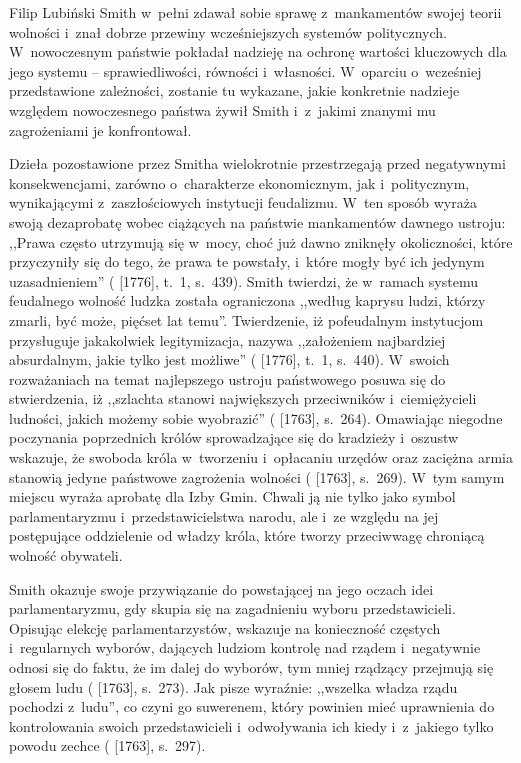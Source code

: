 \begin{artplenv}{Filip Lubiński}
Smith w~pełni zdawał sobie sprawę z~mankamentów swojej teorii wolności i~znał dobrze przewiny wcześniejszych
systemów politycznych. W~nowoczesnym państwie pokładał nadzieję na ochronę wartości kluczowych dla jego
systemu -- sprawiedliwości, równości i~własności. W~oparciu o~wcześniej przedstawione zależności, zostanie tu wykazane, jakie
konkretnie nadzieje względem nowoczesnego państwa żywił Smith i~z~jakimi znanymi mu zagrożeniami je konfrontował.

Dzieła pozostawione przez Smitha wielokrotnie przestrzegają przed negatywnymi konsekwencjami, zarówno o~charakterze
ekonomicznym, jak i~politycznym, wynikającymi z~zaszłościowych instytucji feudalizmu. W~ten sposób wyraża swoją
dezaprobatę wobec ciążących na państwie mankamentów dawnego ustroju: ,,Prawa często utrzymują się w~mocy, choć już dawno
zniknęły okoliczności, które przyczyniły się do tego, że prawa te powstały, i~które mogły być ich jedynym
uzasadnieniem''
(\cite{smith_badania_2007} [1776], t.~1, s.~439).
Smith twierdzi, że w~ramach systemu
feudalnego wolność ludzka została ograniczona ,,według kaprysu ludzi, którzy zmarli, być może, pięćset lat temu''.
Twierdzenie, iż pofeudalnym instytucjom przysługuje jakakolwiek legitymizacja, nazywa ,,założeniem najbardziej
absurdalnym, jakie tylko jest możliwe''
(\cite{smith_badania_2007} [1776], t.~1, s.~440).
W~swoich
rozważaniach na temat najlepszego ustroju państwowego posuwa się do stwierdzenia, iż ,,szlachta stanowi największych
przeciwników i~ciemiężycieli ludności, jakich możemy sobie wyobrazić''
(\cite{smith_lectures_1982} [1763], s.~264).
Omawiając niegodne poczynania poprzednich królów sprowadzające się do kradzieży i~oszustw wskazuje, że swoboda
króla w~tworzeniu i~opłacaniu urzędów oraz zaciężna armia stanowią jedyne państwowe zagrożenia wolności
(\cite{smith_lectures_1982} [1763], s.~269).
W~tym samym miejscu wyraża aprobatę dla Izby Gmin. Chwali ją nie
tylko jako symbol parlamentaryzmu i~przedstawicielstwa narodu, ale i~ze względu na jej postępujące oddzielenie od
władzy króla, które tworzy przeciwwagę chroniącą wolność obywateli.

Smith okazuje swoje przywiązanie do powstającej na jego oczach idei parlamentaryzmu, gdy skupia się na zagadnieniu
wyboru przedstawicieli. Opisując elekcję parlamentarzystów, wskazuje na konieczność częstych i~regularnych wyborów,
dających ludziom kontrolę nad rządem i~negatywnie odnosi się do faktu, że im dalej do wyborów, tym mniej rządzący
przejmują się głosem ludu
(\cite{smith_lectures_1982} [1763], s.~273).
Jak pisze wyraźnie: ,,wszelka władza
rządu pochodzi z~ludu'', co czyni go suwerenem, który powinien mieć uprawnienia do kontrolowania swoich przedstawicieli
i~odwoływania ich kiedy i~z~jakiego tylko powodu zechce
(\cite{smith_lectures_1982} [1763], s.~297).


\end{artplenv}
